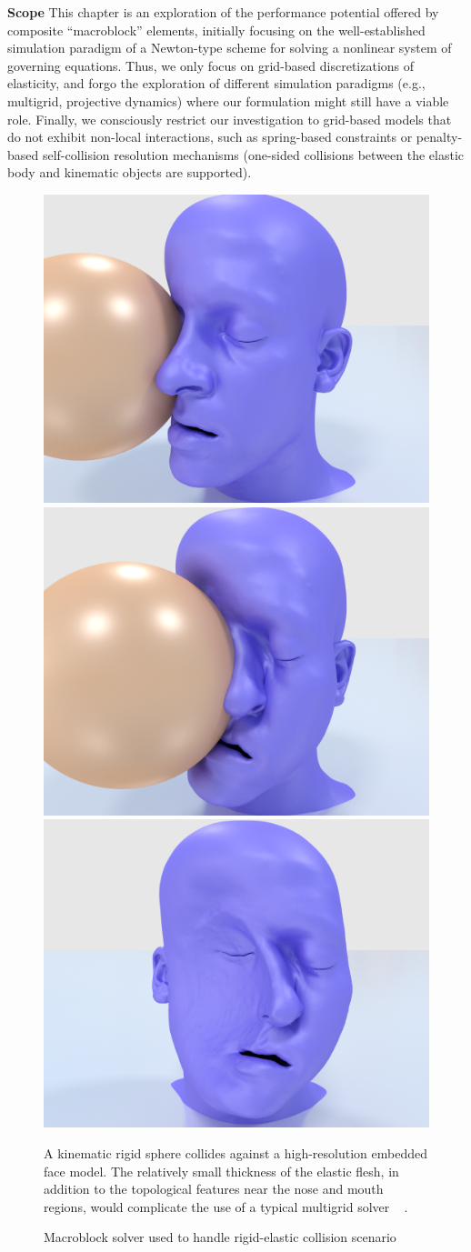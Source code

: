  \textbf{Scope} This chapter is an exploration of the performance
 potential offered by composite ``macroblock'' elements, initially
 focusing on the well-established simulation paradigm of a Newton-type
 scheme for solving a nonlinear system of governing equations. Thus,
 we only focus on grid-based discretizations of elasticity, and forgo
 the exploration of different simulation paradigms (e.g., multigrid,
 projective dynamics) where our formulation might still have a viable
 role.  Finally, we consciously restrict our investigation to
 grid-based models that do not exhibit non-local interactions, such as
 spring-based constraints or penalty-based self-collision resolution
 mechanisms (one-sided collisions between the elastic body and
 kinematic objects are supported).



\begin{figure}
\begin{center}
\includegraphics[width=.32\textwidth]{chapter_macroblocks/images/face_smash1.png}
\includegraphics[width=.32\textwidth]{chapter_macroblocks/images/face_smash2.png}
\includegraphics[width=.32\textwidth]{chapter_macroblocks/images/face_smash3.png} \end{center}

\caption{Macroblock solver used to handle rigid-elastic collision
  scenario }{A kinematic rigid sphere collides against a
  high-resolution embedded face model. The relatively small thickness
  of the elastic flesh, in addition to the topological features near
  the nose and mouth regions, would complicate the use of a typical
  multigrid solver ~\citep{McAdaZSETTS:2011} .}
 \label{fig:macroblocks:face-smash-example}
 \end{figure}

